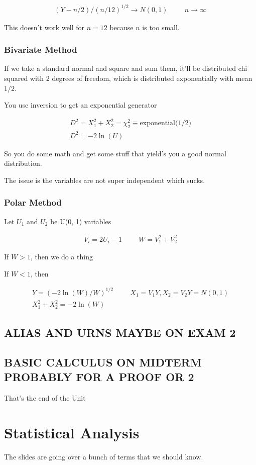 \documentclass[fleqn]{report}
\newcommand{\hp}{\hspace{1cm}}
\newcommand{\equations} [1] {
\begin{gather*}
#1
\end{gather*}
}
\begin{document}
\equations{
    (Y - n/2) / (n / 12)^{1/2}
    \rightarrow 
    N(0, 1)
    \hp 
    n \to \infty 
}

This doesn't work well for $n=12$ because $n$ is too small. 

\subsection{Bivariate Method }
If we take a standard normal and square and sum them, it'll be distributed 
chi squared with 2 degrees of freedom, which is distributed exponentially 
with mean $1/2$. 

You use inversion to get an exponential generator 
\equations{
    D^2 = X^2_1 + X^2_2 = \chi^2_2 \equiv \textrm{exponential(1/2)}
    \\
    D^2 
    =
    -2 \ln(U)
}

So you do some math and get some stuff that yield's you a good 
normal distribution. 

The issue is the variables are not super independent which sucks. 

\subsection{Polar Method}
Let $U_1$ and $U_2$ be U(0, 1) variables 

\equations{
    V_i = 2U_i - 1 
    \hp 
    W = V_1^2 + V_2^2
}

If $W > 1$, then we do a thing 

If $W < 1$, then 

\equations{
    Y = (-2 \ln(W) / W)^{1/2}
    \hp 
    X_1 = V_1 Y 
    ,
    X_2 = V_2 Y 
    =
    N(0, 1)
    \\
    X_1^2 + X_2^2 = -2 \ln(W)
}

\section{ALIAS AND URNS MAYBE ON EXAM 2}

\section{BASIC CALCULUS ON MIDTERM PROBABLY FOR A PROOF OR 2}

That's the end of the Unit 

\chapter{Statistical Analysis}
The slides are going over a bunch of terms that we should know. 
\end{document}
